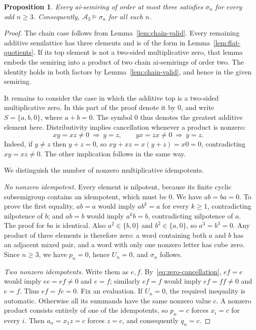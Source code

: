 \documentclass[11pt,reqno]{amsart}
\numberwithin{equation}{section}
\newtheorem{proposition}[theorem]{Proposition}
\theoremstyle{definition}
\theoremstyle{remark}
\newcommand{\Athree}{\mathcal A_3}
\begin{document}
\begin{proposition}\label{prop:valid}
Every ai-semiring of order at most three satisfies $\sigma_n$
for every odd $n\geq3$. Consequently,
$\Athree\models\sigma_n$ for all such $n$.
\end{proposition}

\begin{proof}
The chain case follows from Lemma~\ref{lem:chain-valid}.
Every remaining additive semilattice has three elements and is
of the form in Lemma~\ref{lem:flat-quotients}. If its top element
is not a two-sided multiplicative zero, that lemma embeds the
semiring into a product of two chain ai-semirings of order two.
The identity holds in both factors by Lemma~\ref{lem:chain-valid},
and hence in the given semiring.

It remains to consider the case in which the additive top is
a two-sided multiplicative zero. In this part of the proof denote
it by $0$, and write $S=\{a,b,0\}$, where $a+b=0$.
The symbol $0$ thus denotes the greatest additive element here.
Distributivity implies cancellation whenever a product is nonzero:
\begin{equation}\label{eq:zero-cancellation}
xy=xz\ne0\ \Longrightarrow\ y=z,\qquad
yx=zx\ne0\ \Longrightarrow\ y=z.
\end{equation}
Indeed, if $y\ne z$ then $y+z=0$, so
$xy+xz=x(y+z)=x0=0$, contradicting $xy=xz\ne0$.
The other implication follows in the same way.

We distinguish the number of nonzero multiplicative idempotents.

\emph{No nonzero idempotent.}
Every element is nilpotent, because its finite cyclic subsemigroup
contains an idempotent, which must be $0$. We have $ab=ba=0$.
To prove the first equality, $ab=a$ would imply $ab^k=a$ for
every $k\geq1$, contradicting nilpotence of $b$; and $ab=b$
would imply $a^k b=b$, contradicting nilpotence of $a$.
The proof for $ba$ is identical. Also $a^2\in\{b,0\}$ and
$b^2\in\{a,0\}$, so $a^3=b^3=0$. Any product of three
elements is therefore zero: a word containing both $a$ and $b$
has an adjacent mixed pair, and a word with only one nonzero
letter has cube zero. Since $n\geq3$, we have $p_n=0$, hence
$U_n=0$, and $\sigma_n$ follows.

\emph{Two nonzero idempotents.}
Write them as $e,f$. By~\eqref{eq:zero-cancellation},
$ef=e$ would imply $ee=ef\ne0$ and $e=f$; similarly $ef=f$
would imply $ef=ff\ne0$ and $e=f$. Thus $ef=fe=0$.
Fix an evaluation. If $U_n=0$, the required inequality is
automatic. Otherwise all its summands have the same nonzero
value $c$. A nonzero product consists entirely of one of
the idempotents, so $p_n=c$ forces $x_i=c$ for every $i$.
Then $a_n=x_1z=c$ forces $z=c$, and consequently $q_n=c$.


\end{proof}
\end{document}
